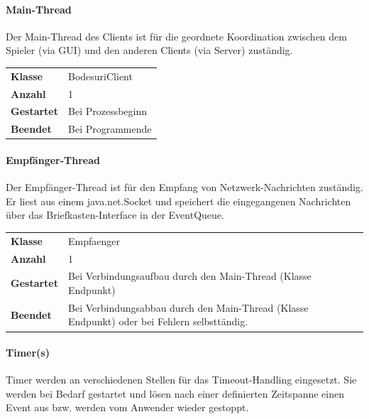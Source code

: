 \documentclass[12pt,halfparskip]{scrartcl}
\begin{document}

\paragraph{Main-Thread} %
\label{ssub:main_thread}

Der Main-Thread des Clients ist für die geordnete Koordination zwischen dem Spieler (via GUI) und den anderen Clients (via Server) zuständig.


\begin{tabular}{@{} l p{12.5cm}}
\textbf{Klasse}       & BodesuriClient \\
\textbf{Anzahl}       & 1 \\
\textbf{Gestartet}    & Bei Prozessbeginn \\
\textbf{Beendet}      & Bei Programmende
\end{tabular}


\paragraph{Empfänger-Thread} %
\label{ssub:empfänger_thread}

Der Empfänger-Thread ist für den Empfang von Netzwerk-Nachrichten zuständig. Er liest aus einem java.net.Socket und speichert die eingegangenen Nachrichten über das Briefkasten-Interface in der EventQueue.

\begin{tabular}{@{} l p{12.5cm}}
\textbf{Klasse}       & Empfaenger \\
\textbf{Anzahl}       & 1 \\
\textbf{Gestartet}    & Bei Verbindungsaufbau durch den Main-Thread (Klasse Endpunkt) \\
\textbf{Beendet}      & Bei Verbindungsabbau durch den Main-Thread (Klasse Endpunkt) oder bei Fehlern selbsttändig.
\end{tabular}


\paragraph{Timer(s)} %
\label{ssub:timer_s_}


Timer werden an verschiedenen Stellen für das Timeout-Handling eingesetzt. Sie werden bei Bedarf gestartet und lösen nach einer definierten Zeitspanne einen Event aus bzw. werden vom Anwender wieder gestoppt.
\end{document}

